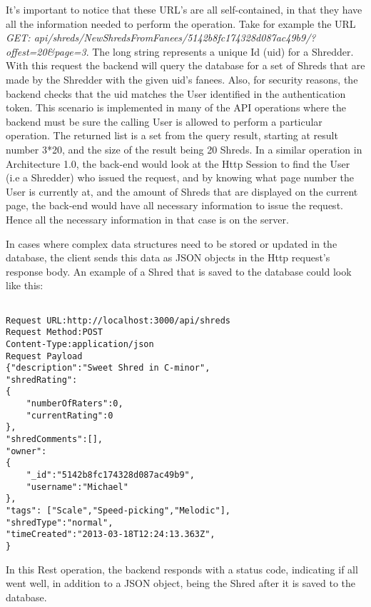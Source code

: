 It's important to notice that these URL's are all self-contained, in that they have all the information needed to perform the operation. Take for example the URL \textit{GET: api/shreds/NewShredsFromFanees/5142b8fc174328d087ac49b9/?offest=20\&page=3}. The long string represents a unique Id (uid) for a Shredder. With this request the backend will query the database for a set of Shreds that are made by the Shredder with the given uid's fanees. Also, for security reasons, the backend checks that the uid matches the User identified in the authentication token. This scenario is implemented in many of the API operations where the backend must be sure the calling User is allowed to perform a particular operation. The returned list is a set from the query result, starting at result number 3*20, and the size of the result being 20 Shreds. In a similar operation in Architecture 1.0, the back-end would look at the Http Session to find the User (i.e a Shredder) who issued the request, and by knowing what page number the User is currently at, and the amount of Shreds that are displayed on the current page, the back-end would have all necessary information to issue the request. Hence all the necessary information in that case is on the server. 

In cases where complex data structures need to be stored or updated in the database, the client sends this data as JSON objects in the Http request's response body. An example of a Shred that is saved to the database could look like this:

\begin{lstlisting}

Request URL:http://localhost:3000/api/shreds
Request Method:POST
Content-Type:application/json
Request Payload
{"description":"Sweet Shred in C-minor",
"shredRating":
{
	"numberOfRaters":0,
	"currentRating":0
},
"shredComments":[],
"owner":
{
	"_id":"5142b8fc174328d087ac49b9",
	"username":"Michael"
},
"tags": ["Scale","Speed-picking","Melodic"],
"shredType":"normal",
"timeCreated":"2013-03-18T12:24:13.363Z",
}
\end{lstlisting}

In this Rest operation, the backend responds with a status code, indicating if all went well, in addition to a JSON object, being the Shred after it is saved to the database. 

